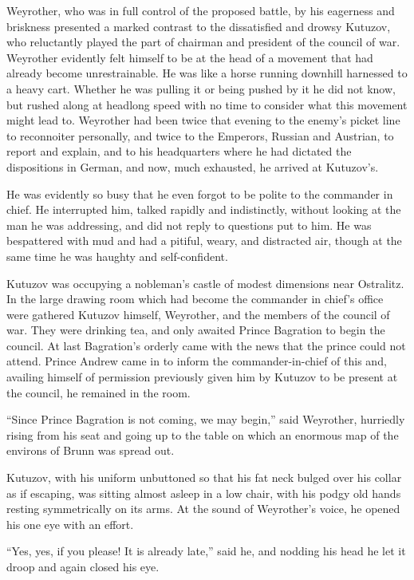 Weyrother, who was in full control of the proposed battle, by his
eagerness and briskness presented a marked contrast to the
dissatisfied and drowsy Kutuzov, who reluctantly played the part
of chairman and president of the council of war. Weyrother
evidently felt himself to be at the head of a movement that had
already become unrestrainable. He was like a horse running
downhill harnessed to a heavy cart. Whether he was pulling it or
being pushed by it he did not know, but rushed along at headlong
speed with no time to consider what this movement might lead
to. Weyrother had been twice that evening to the enemy's picket
line to reconnoiter personally, and twice to the Emperors,
Russian and Austrian, to report and explain, and to his
headquarters where he had dictated the dispositions in German,
and now, much exhausted, he arrived at Kutuzov's.

He was evidently so busy that he even forgot to be polite to the
commander in chief. He interrupted him, talked rapidly and
indistinctly, without looking at the man he was addressing, and
did not reply to questions put to him. He was bespattered with
mud and had a pitiful, weary, and distracted air, though at the
same time he was haughty and self-confident.

Kutuzov was occupying a nobleman's castle of modest dimensions
near Ostralitz. In the large drawing room which had become the
commander in chief's office were gathered Kutuzov himself,
Weyrother, and the members of the council of war. They were
drinking tea, and only awaited Prince Bagration to begin the
council. At last Bagration's orderly came with the news that the
prince could not attend. Prince Andrew came in to inform the
commander-in-chief of this and, availing himself of permission
previously given him by Kutuzov to be present at the council, he
remained in the room.

``Since Prince Bagration is not coming, we may begin,'' said
Weyrother, hurriedly rising from his seat and going up to the
table on which an enormous map of the environs of Brunn was
spread out.

Kutuzov, with his uniform unbuttoned so that his fat neck bulged
over his collar as if escaping, was sitting almost asleep in a
low chair, with his podgy old hands resting symmetrically on its
arms. At the sound of Weyrother's voice, he opened his one eye
with an effort.

``Yes, yes, if you please! It is already late,'' said he, and
nodding his head he let it droop and again closed his eye.

